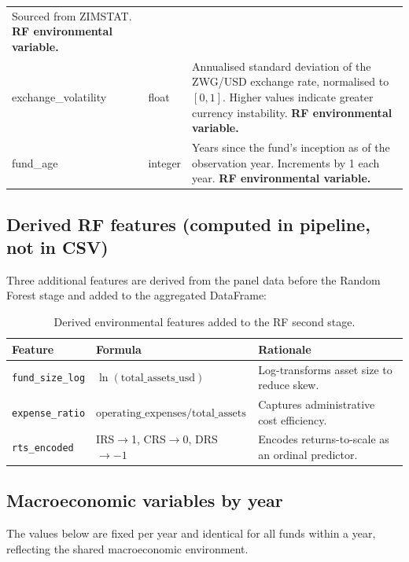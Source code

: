 \documentclass[12pt,a4paper]{article}
\begin{document}
\begin{longtable}{>{\ttfamily}p{4.8cm} p{2.2cm} p{7.4cm}}
                            Sourced from ZIMSTAT.
                            \textbf{RF environmental variable.} \\[4pt]
exchange\_volatility & float & Annualised standard deviation of the ZWG/USD exchange
                               rate, normalised to $[0,1]$.
                               Higher values indicate greater currency instability.
                               \textbf{RF environmental variable.} \\[4pt]
fund\_age         & integer & Years since the fund's inception as of the observation
                              year.  Increments by 1 each year.
                              \textbf{RF environmental variable.} \\
\end{longtable}

\subsection*{Derived RF features (computed in pipeline, not in CSV)}

Three additional features are derived from the panel data before the Random Forest
stage and added to the aggregated DataFrame:

\begin{table}[H]
\centering
\begin{tabular}{lll}
\toprule
\textbf{Feature} & \textbf{Formula} & \textbf{Rationale} \\
\midrule
\texttt{fund\_size\_log}  & $\ln(\text{total\_assets\_usd})$ &
    Log-transforms asset size to reduce skew. \\
\texttt{expense\_ratio}   & $\text{operating\_expenses} / \text{total\_assets}$ &
    Captures administrative cost efficiency. \\
\texttt{rts\_encoded}     & IRS$\to$1, CRS$\to$0, DRS$\to-1$ &
    Encodes returns-to-scale as an ordinal predictor. \\
\bottomrule
\end{tabular}
\caption{Derived environmental features added to the RF second stage.}
\end{table}

\subsection*{Macroeconomic variables by year}

The values below are fixed per year and identical for all funds within a year,
reflecting the shared macroeconomic environment.
\end{document}
